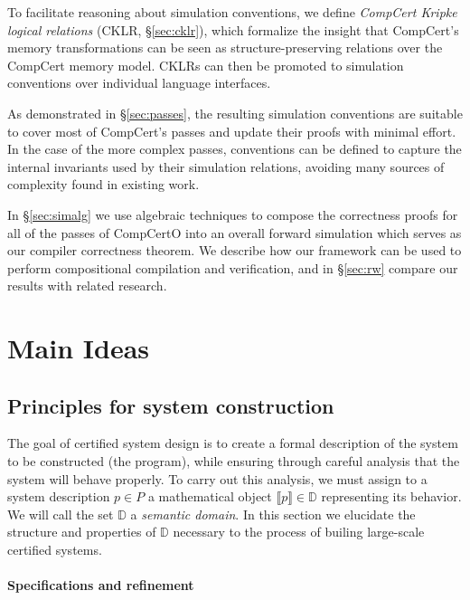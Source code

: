 \documentclass[sigplan,10pt,review,anonymous]{acmart}\settopmatter{printfolios=true,printccs=false,printacmref=false}
\begin{document}
To facilitate reasoning about
simulation conventions,
we define \emph{CompCert Kripke logical relations}
(CKLR, \S\ref{sec:cklr}),
which formalize the insight that
CompCert's memory transformations can be seen
as structure-preserving relations
over the CompCert memory model.
CKLRs can then be promoted to simulation conventions
over individual language interfaces.

As demonstrated in \S\ref{sec:passes},
the resulting simulation conventions
are suitable to cover most of CompCert's passes
and update their proofs with minimal effort.
In the case of the more complex passes,
conventions can be defined
to capture the internal invariants
used by their simulation relations,
avoiding many sources of complexity found
in existing work.

In \S\ref{sec:simalg} we use algebraic techniques
to compose the correctness proofs for all of the passes of CompCertO
into an overall forward simulation
which serves as our compiler correctness theorem.
We describe how our framework
can be used to perform compositional compilation and verification,
and in \S\ref{sec:rw} compare our results with related research.



\section{Main Ideas} \label{sec:mainideas} %

\subsection{Principles for system construction} \label{sec:principles} %


The goal of certified system design is
to create a formal description of
the system to be constructed (the program),
while ensuring through careful analysis that the system
will behave properly.
To carry out this analysis,
we must assign
to a system description $p \in P$
a mathematical object $\llbracket p \rrbracket \in \mathbb{D}$
representing its behavior.
We will call the set $\mathbb{D}$ a \emph{semantic domain}.
In this section we elucidate
the structure and properties of $\mathbb{D}$
necessary to the process of builing
large-scale certified systems.


\paragraph{Specifications and refinement} %
\end{document}
